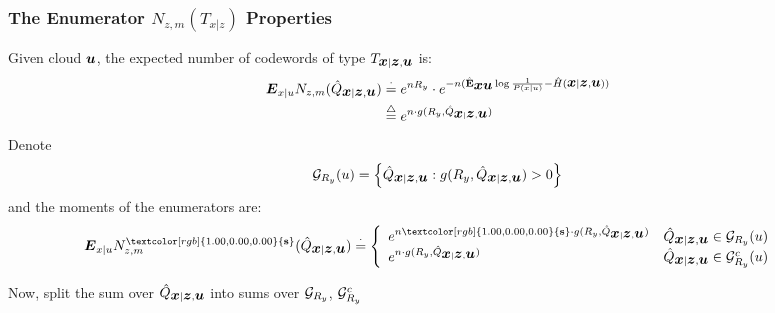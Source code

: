\documentclass[mathserif]{beamer}
\newcommand {\exe} {\stackrel{\cdot} {=}}
\newcommand{\eqd}{\stackrel{\triangle}{=}}
\newcommand {\bu} {\mbox{\boldmath $u$}}
\newcommand {\bx} {\mbox{\boldmath $x$}}
\newcommand {\bz} {\mbox{\boldmath $z$}}
\newcommand {\bE} {\mbox{\boldmath $E$}}
\newcommand{\calG}{{\cal G}}
\newcommand {\bhE}{\hat{\textbf{E}}}
\newcommand {\hH}{\hat{H}}
\newcommand {\hQ}{\hat{Q}}
\begin{document}
\begin{frame}
\frametitle{The Enumerator $N_{z,m}(T_{x|z})$ Properties}
\begin{block}{}
Given cloud $\bu$, the expected number of codewords of type $T_{\bx|\bz,\bu}$ is:
\begin{align*}
     \bE_{x|u} N_{z,m}(\hQ_{\bx|\bz,\bu}) &\exe e^{nR_y}\cdot e^{-n(\bhE_{\bx\bu}\log\frac 1 {P(x|u)}-\hH(\bx|\bz,\bu))}\\
      &\eqd e^{n\cdot g(R_y, \hQ_{\bx|\bz,\bu})}
\end{align*}
Denote
\begin{align*}
    \calG_{R_y}(u) = \left\{\hQ_{\bx|\bz,\bu} : g(R_y, \hQ_{\bx|\bz,\bu}) >0\right\}
\end{align*}
and the moments of the enumerators are:
\begin{align*}
    &\bE_{x|u} N_{z,m}^{\textcolor[rgb]{1.00,0.00,0.00}{\textbf{s}}}(\hQ_{\bx|\bz,\bu})
    \exe \left\{\begin{array}{ll}
    e^{n\textcolor[rgb]{1.00,0.00,0.00}{\textbf{s}}\cdot g(R_y, \hQ_{\bx|\bz,\bu})} &\hQ_{\bx|\bz,\bu} \in \calG_{R_y}(u) \\
    e^{n\cdot g(R_y, \hQ_{\bx|\bz,\bu})} & \hQ_{\bx|\bz,\bu} \in \calG_{R_y}^c(u)
    \end{array}\right.
\end{align*}
\end{block}
\pause
Now, split the sum over $\hQ_{\bx|\bz,\bu}$ into sums over $\calG_{R_y}$, $\calG^c_{R_y}$
%
\end{frame}
\end{document}

